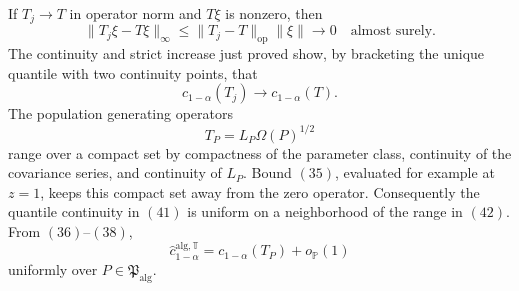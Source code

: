 If \(T_j\to T\) in operator norm and \(T\xi\) is nonzero, then
\[
 \|T_j\xi-T\xi\|_\infty
 \le\|T_j-T\|_{\mathrm{op}}\|\xi\|\longrightarrow0
 \quad\text{almost surely}.
\tag{40}
\]
The continuity and strict increase just proved show, by bracketing the unique quantile with two continuity points, that
\[
 c_{1-\alpha}(T_j)\longrightarrow c_{1-\alpha}(T).
\tag{41}
\]
The population generating operators
\[
 T_P=L_P\Omega(P)^{1/2}
\tag{42}
\]
range over a compact set by compactness of the parameter class, continuity of the covariance series, and continuity of \(L_P\).  Bound \((35)\), evaluated for example at \(z=1\), keeps this compact set away from the zero operator.  Consequently the quantile continuity in \((41)\) is uniform on a neighborhood of the range in \((42)\).  From \((36)\)--\((38)\),
\[
 \widehat c_{1-\alpha}^{\mathrm{alg},\mathbb T}
 =c_{1-\alpha}(T_P)+o_{\mathbb P}(1)
\tag{43}
\]
uniformly over \(P\in\mathfrak P_{\mathrm{alg}}\).

